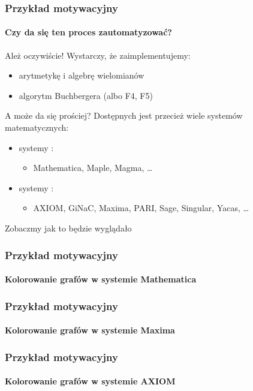 \documentclass{beamer}
\begin{document}
\begin{frame}
    \frametitle{Przykład motywacyjny}
    \framesubtitle{Czy da się ten proces zautomatyzować?}

    Ależ oczywiście! Wystarczy, że zaimplementujemy:
    \begin{itemize}
        \item arytmetykę i algebrę wielomianów
        \item algorytm Buchbergera (albo F4, F5)
    \end{itemize}
    \pause
    A może da się prościej? \newline
    \pause
    Dostępnych jest przecież wiele systemów matematycznych:
    \pause
    \begin{itemize}
        \item systemy :
            \begin{itemize}
                \item Mathematica, Maple, Magma, \ldots
            \end{itemize}
            \pause
        \item systemy :
            \begin{itemize}
                \item AXIOM, GiNaC, Maxima, PARI, Sage, Singular, Yacas, \ldots
            \end{itemize}
    \end{itemize}
    \pause
    Zobaczmy jak to będzie wyglądało \structure{$\ldots$}
\end{frame}

\begin{frame}[fragile]
    \frametitle{Przykład motywacyjny}
    \framesubtitle{Kolorowanie grafów w systemie Mathematica}

    
\end{frame}

\begin{frame}[fragile]
    \frametitle{Przykład motywacyjny}
    \framesubtitle{Kolorowanie grafów w systemie Maxima}

    
\end{frame}

\begin{frame}[fragile]
    \frametitle{Przykład motywacyjny}
    \framesubtitle{Kolorowanie grafów w systemie AXIOM}

    
\end{frame}
\end{document}
